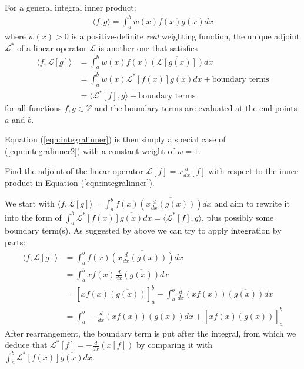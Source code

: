 \begin{proper}
\label{proper:adjointinnerint}
For a general integral inner product:
\begin{align}
\langle f,g \rangle = \int_a^b w(x) f(x) \overline{g(x)} dx \label{eqn:integralinner2}
\end{align}
where $w(x) > 0$ is a positive-definite \textit{real} weighting function, the unique adjoint $\mathcal{L}^*$ of a linear operator $\mathcal{L}$ is another one that satisfies
\begin{align*}
\langle f,\mathcal{L}[g] \rangle &= \int_a^b w(x) f(x) \overline{(\mathcal{L}[g(x)])} dx \\ 
&= \int_a^b w(x) \mathcal{L}^*[f(x)] \overline{g(x)} dx + \text{boundary terms} \\
&= \langle \mathcal{L}^*[f],g \rangle + \text{boundary terms}
\end{align*}
for all functions $f, g \in \mathcal{V}$ and the boundary terms are evaluated at the end-points $a$ and $b$.
\end{proper}
Equation (\ref{eqn:integralinner}) is then simply a special case of (\ref{eqn:integralinner2}) with a constant weight of $w = 1$.
\begin{exmp}
Find the adjoint of the linear operator $\mathcal{L}[f] = x\frac{d}{dx}[f]$ with respect to the inner product in Equation (\ref{eqn:integralinner}).
\end{exmp}
\begin{solution}
We start with $\langle f,\mathcal{L}[g] \rangle = \int_a^b f(x) \overline{\left(x\frac{d}{dx}(g(x))\right)} dx$ and aim to rewrite it into the form of $\int_a^b \mathcal{L}^*[f(x)] \overline{g(x)} dx = \langle \mathcal{L}^*[f],g \rangle$, plus possibly some boundary term(s). As suggested by above we can try to apply integration by parts:
\begin{align*}
\langle f,\mathcal{L}[g] \rangle &= \int_a^b f(x) \overline{\left(x\frac{d}{dx}(g(x))\right)} dx \\  
&= \int_a^b xf(x) \frac{d}{dx}\overline{(g(x))} dx \\
&= [xf(x)\overline{(g(x))}]_a^b - \int_a^b \frac{d}{dx}(xf(x))\overline{(g(x))} dx \\
&= \int_a^b -\frac{d}{dx}(xf(x))\overline{(g(x))} dx + [xf(x)\overline{(g(x))}]_a^b
\end{align*}
After rearrangement, the boundary term is put after the integral, from which we deduce that $\mathcal{L}^*[f] = -\frac{d}{dx}(x[f])$ by comparing it with $\int_a^b \mathcal{L}^*[f(x)] \overline{g(x)} dx$.
\end{solution}
